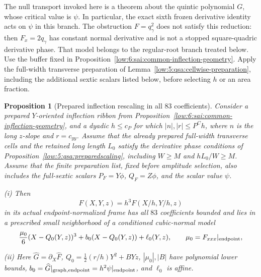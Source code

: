 \documentclass[11pt]{amsart}
\newtheorem{proposition}[theorem]{Proposition}
\theoremstyle{definition}
\theoremstyle{remark}
\numberwithin{equation}{section}
\begin{document}
The null transport invoked here is a theorem about the quintic polynomial $G$, whose critical value is $\psi$. In particular, the exact sixth frozen derivative identity acts on $\psi$ in this branch. The obstruction $F=q_\gamma^2$ does not satisfy this reduction: then $F_x=2q_\gamma$ has constant normal derivative and is not a stopped square-quadric derivative phase. That model belongs to the regular-root branch treated below.
Use the buffer fixed in Proposition~\ref{low:6:sai:common-inflection-geometry}. Apply the full-width transverse preparation of Lemma~\ref{low:5:qsa:cellwise-preparation}, including the additional sextic scalars listed below, before selecting $h$ or an area fraction.
\begin{proposition}[Prepared inflection rescaling in all $83$ coefficients]\label{low:6:sai:inflection-rescaling}
Consider a prepared $Y$-oriented inflection ribbon from Proposition~\ref{low:6:sai:common-inflection-geometry}, and a dyadic $h\le c_P$ for which $|n|,|r|\le P^Ch$, where $n$ is the long $z$-slope and $r=c_{yy}$. Assume that the already prepared full-width transverse cells and the retained long length $L_0$ satisfy the derivative phase conditions of Proposition~\ref{low:5:qsa:preparedscaling}, including $W\ge M$ and $hL_0/W\ge M$. Assume that the finite preparation list, fixed before amplitude selection, also includes the full-sextic scalars $P_F=Y\phi$, $Q_F=Z\phi$, and the scalar value $\psi$.

\noindent\textup{(i)} Then
\[
\widehat F(X,Y,z)=h^3F(X/h,Y/h,z)
\]
in its actual endpoint-normalized frame has all $83$ coefficients bounded and lies in a prescribed small neighborhood of a conditioned cubic-normal model
\[
\frac{\mu_0}{6}(X-Q_0(Y,z))^3+b_0(X-Q_0(Y,z))+\ell_0(Y,z),\qquad \mu_0=F_{xxx}|_{\rm endpoint},
\]

\noindent\textup{(ii)} Here $\widehat G=\partial_X\widehat F$, $Q_0=\tfrac12(r/h)Y^2+BYz$, $|\mu_0|,|B|$ have polynomial lower bounds, $b_0=\widehat G|_{\rm graph,endpoint}=h^2\psi|_{\rm endpoint}$, and $\ell_0$ is affine.
\end{proposition}
\end{document}
